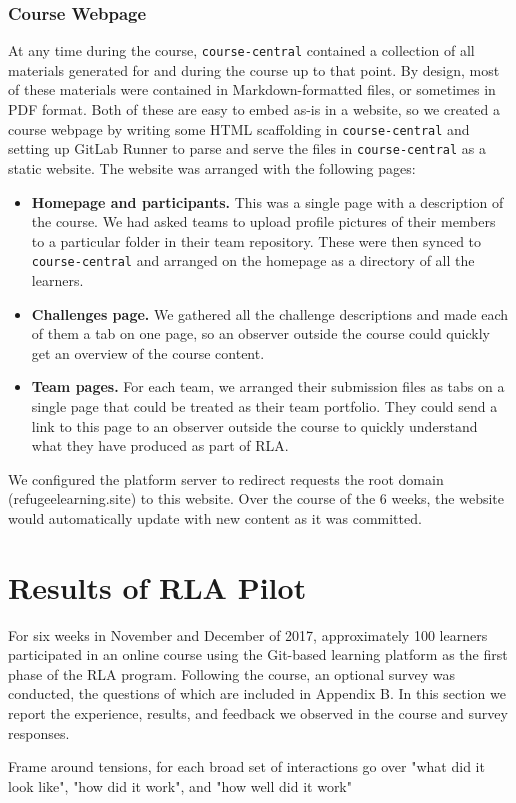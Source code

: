 \documentclass[12pt,twoside]{mitthesis}
\newcommand{\review}[1]{{\color{mygreen} #1}}
\begin{document}
{\subsection{Course Webpage}

At any time during the course, \texttt{course-central} contained a collection of all materials generated for and during the course up to that point. By design, most of these materials were contained in Markdown-formatted files, or sometimes in PDF format. Both of these are easy to embed as-is in a website, so we created a course webpage by writing some HTML scaffolding in \texttt{course-central} and setting up GitLab Runner to parse and serve the files in \texttt{course-central} as a static website. The website was arranged with the following pages:
\begin{itemize}
\item \textbf{Homepage and participants.} This was a single page with a description of the course. We had asked teams to upload profile pictures of their members to a particular folder in their team repository. These were then synced to \texttt{course-central} and arranged on the homepage as a directory of all the learners.
\item \textbf{Challenges page.} We gathered all the challenge descriptions and made each of them a tab on one page, so an observer outside the course could quickly get an overview of the course content.
\item \textbf{Team pages.} For each team, we arranged their submission files as tabs on a single page that could be treated as their team portfolio. They could send a link to this page to an observer outside the course to quickly understand what they have produced as part of RLA.
\end{itemize}
We configured the platform server to redirect requests the root domain (refugeelearning.site) to this website. Over the course of the 6 weeks, the website would automatically update with new content as it was committed.
}

\chapter{Results of RLA Pilot}

\review{For six weeks in November and December of 2017, approximately 100 learners participated in an online course using the Git-based learning platform as the first phase of the RLA program. Following the course, an optional survey was conducted, the questions of which are included in Appendix B. In this section we report the experience, results, and feedback we observed in the course and survey responses.

Frame around tensions, for each broad set of interactions go over "what did it look like", "how did it work", and "how well did it work"}
\end{document}
